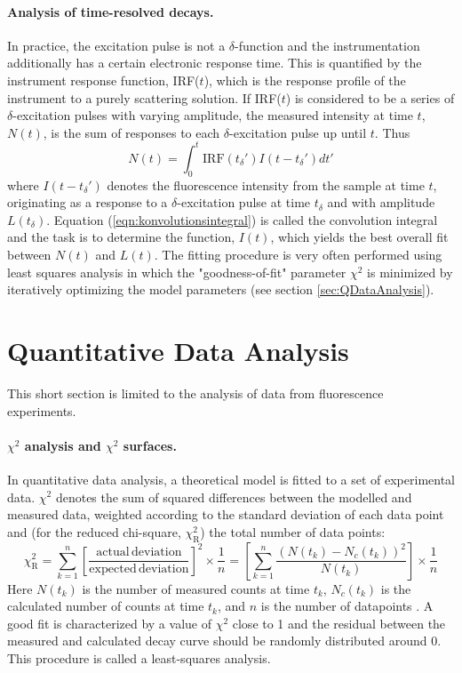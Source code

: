  \paragraph{Analysis of time-resolved decays.} In practice, the excitation pulse is not a $\delta$-function and the instrumentation additionally has a certain electronic response time. This is quantified by the instrument response function, IRF($t$), which is the response profile of the instrument to a purely scattering solution. If IRF($t$) is considered to be a series of $\delta$-excitation pulses with varying amplitude, the measured intensity at time $t$, $N(t)$, is the sum of responses to each $\delta$-excitation pulse up until $t$. Thus
\begin{equation}
 N(t) = \int_0^t \mathrm{IRF}(t_\delta')I(t-t_\delta') dt'
 \label{eqn:konvolutionsintegral}
\end{equation}
 where $I(t-t_\delta')$ denotes the fluorescence intensity from the sample at time $t$, originating as a response to a $\delta$-excitation pulse at time $t_\delta$ and with amplitude $L(t_\delta)$. Equation (\ref{eqn:konvolutionsintegral}) is called the convolution integral and the task is to determine the function, $I(t)$, which yields the best overall fit between $N(t)$ and $L(t)$. The fitting procedure is very often performed using least squares analysis in which the "goodness-of-fit" parameter $\chi^2$ is minimized by iteratively optimizing the model parameters (see section \ref{sec:QDataAnalysis}).\cite{Lak}

\section{Quantitative Data Analysis}
 This short section is limited to the analysis of data from fluorescence experiments.
\label{sec:QDataAnalysis}

 \paragraph{$\chi^2$ analysis and $\chi^2$ surfaces.} In quantitative data analysis, a theoretical model is fitted to a set of experimental data. $\chi^2$ denotes the sum of squared differences between the modelled and measured data, weighted according to the standard deviation of each data point and (for the reduced chi-square, $\chi_\mathrm{R}^2$) the total number of data points:
\[
 \chi_\mathrm{R}^2 = \sum_{k=1}^n\left[\frac{\mathrm{actual\, deviation}}{\mathrm{expected\, deviation}}\right]^2 \times\frac{1}{n}= \left[\sum_{k=1}^n\frac{\left(N(t_k)-N_c(t_k)\right)^2}{N(t_k)}\right]\times\frac{1}{n}
\]
 Here $N(t_k)$ is the number of measured counts at time $t_k$, $N_c(t_k)$ is the calculated number of counts at time $t_k$, and $n$ is the number of datapoints \cite{Lak}. A good fit is characterized by a value of $\chi^2$ close to 1 and the residual between the measured and calculated decay curve should be randomly distributed around 0. This procedure is called a least-squares analysis.

